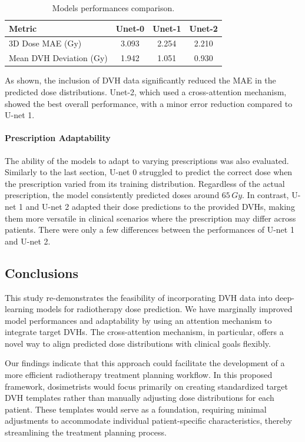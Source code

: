 \begin{table}
	\centering
	\begin{tabular}{|l|c|c|c|}
		\hline
		\textbf{Metric}         & \textbf{Unet-0} & \textbf{Unet-1} & \textbf{Unet-2} \\
		\hline
		3D Dose MAE (Gy)        & 3.093           & 2.254           & 2.210           \\
		\hline
		Mean DVH Deviation (Gy) & 1.942           & 1.051           & 0.930           \\
		\hline
	\end{tabular}
	\caption{Models performances comparison.}
	\label{tab:model_performance}
\end{table}

As shown, the inclusion of DVH data significantly reduced the MAE in the predicted dose distributions.
Unet-2, which used a cross-attention mechanism, showed the best overall performance, with a minor error reduction compared to U-net 1.

\paragraph{Prescription Adaptability}
The ability of the models to adapt to varying prescriptions was also evaluated.
Similarly to the last section, U-net 0 struggled to predict the correct dose when the prescription varied from its training distribution.
Regardless of the actual prescription, the model consistently predicted doses around $65\,\textit{Gy}$.
In contrast, U-net 1 and U-net 2 adapted their dose predictions to the provided DVHs, making them more versatile in clinical scenarios where the prescription may differ across patients.
There were only a few differences between the performances of U-net 1 and U-net 2.

\subsection{Conclusions}
This study re-demonstrates the feasibility of incorporating DVH data into deep-learning models for radiotherapy dose prediction.
We have marginally improved model performances and adaptability by using an attention mechanism to integrate target DVHs.
The cross-attention mechanism, in particular, offers a novel way to align predicted dose distributions with clinical goals flexibly.

Our findings indicate that this approach could facilitate the development of a more efficient radiotherapy treatment planning workflow.
In this proposed framework, dosimetrists would focus primarily on creating standardized target DVH templates rather than manually adjusting dose distributions for each patient.
These templates would serve as a foundation, requiring minimal adjustments to accommodate individual patient-specific characteristics, thereby streamlining the treatment planning process.

